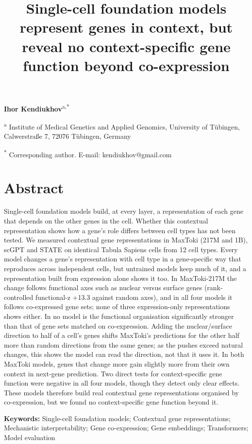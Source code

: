 \documentclass[
  11pt,
]{article}
\title{Single-cell foundation models represent genes in context, but
reveal no context-specific gene function beyond co-expression}
\author{}
\date{}
\newcounter{none} %
\begin{document}
\maketitle

\textbf{Ihor Kendiukhov}\textsuperscript{a,*}

\textsuperscript{a} Institute of Medical Genetics and Applied Genomics,
University of Tübingen, Calwerstraße 7, 72076 Tübingen, Germany

\textsuperscript{*} Corresponding author. E-mail: kendiukhov@gmail.com

\section{Abstract}\label{abstract}

Single-cell foundation models build, at every layer, a representation of
each gene that depends on the other genes in the cell. Whether this
contextual representation shows how a gene's role differs between cell
types has not been tested. We measured contextual gene representations
in MaxToki (217M and 1B), scGPT and STATE on identical Tabula Sapiens
cells from 12 cell types. Every model changes a gene's representation
with cell type in a gene-specific way that reproduces across independent
cells, but untrained models keep much of it, and a representation built
from expression alone shows it too. In MaxToki-217M the change follows
functional axes such as nuclear versus surface genes (rank-controlled
functional-z +13.3 against random axes), and in all four models it
follows co-expressed gene sets; none of three expression-only
representations shows either. In no model is the functional organisation
significantly stronger than that of gene sets matched on co-expression.
Adding the nuclear/surface direction to half of a cell's genes shifts
MaxToki's predictions for the other half more than random directions
from the same genes; as the pushes exceed natural changes, this shows
the model can read the direction, not that it uses it. In both MaxToki
models, genes that change more gain slightly more from their own context
in next-gene prediction. Two direct tests for context-specific gene
function were negative in all four models, though they detect only clear
effects. These models therefore build real contextual gene
representations organised by co-expression, but we found no
context-specific gene function beyond it.

\textbf{Keywords:} Single-cell foundation models; Contextual gene
representations; Mechanistic interpretability; Gene co-expression; Gene
embeddings; Transformers; Model evaluation
\end{document}
